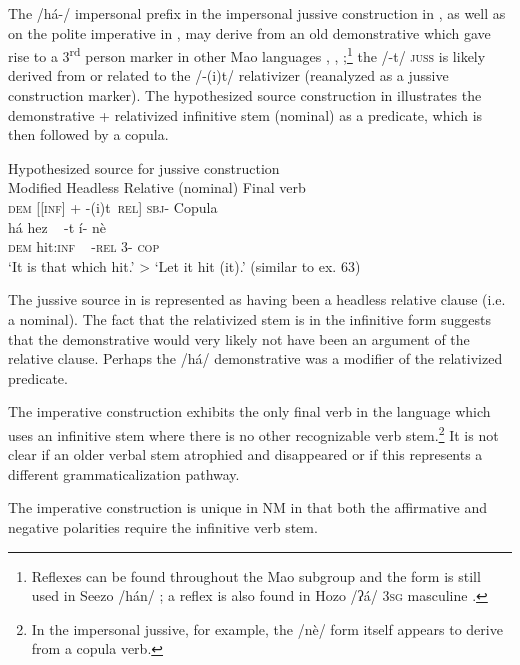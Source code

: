 \documentclass[output=paper]{langsci/langscibook}
\begin{document}
The /há-/ impersonal prefix in the impersonal jussive construction in , as well as on the polite imperative in , may derive from an old demonstrative which gave rise to a 3\textsuperscript{rd} person marker in other Mao languages \citep[206]{Bender2000}, \citep[245-246]{Ahland2012}, \citep{Ahland2015};\footnote{Reflexes can be found throughout the Mao subgroup and the form is still used in Seezo /hán/ \citep{Mengistu2015}; a reflex is also found in Hozo /ʔá/ \textsc{3sg} masculine \citep{Kassa2014}.} the /-t/ \textsc{juss} is likely derived from or related to the /-(i)t/ relativizer (reanalyzed as a jussive construction marker). The hypothesized source construction in  illustrates the demonstrative + relativized infinitive stem (nominal) as a predicate, which is then followed by a copula. 

\ea\label{ex:mahland:65}
Hypothesized source for jussive construction\\
Modified Headless Relative (nominal)  Final verb\\
\glll \textsc{dem}   [[\textsc{inf}]          + -(i)t~\textsc{rel]}                \textsc{sbj-} Copula\\
              há   {\db}{\db}hez              ~   {}-t                    í-   nè     \\
      \textsc{dem} {\db}{\db}hit\textsc{:inf} ~ \textsc{{}-rel}                3-   \textsc{cop}\\
\glt `It is that which hit.' {>} `Let it hit (it).' (similar to ex. 63)
\z

The jussive source in  is represented as having been a headless relative clause (i.e. a nominal). The fact that the relativized stem is in the infinitive form suggests that the demonstrative would very likely not have been an argument of the relative clause. Perhaps the /há/ demonstrative was a modifier of the relativized predicate.

The imperative construction exhibits the only final verb in the language which uses an infinitive stem where there is no other recognizable verb stem.\footnote{ In the impersonal jussive, for example, the /nè/ form itself appears to derive from a copula verb.} It is not clear if an older verbal stem atrophied and disappeared or if this represents a different grammaticalization pathway. 

The imperative construction  is unique in NM in that both the affirmative and negative polarities require the infinitive verb stem.  
\end{document}
